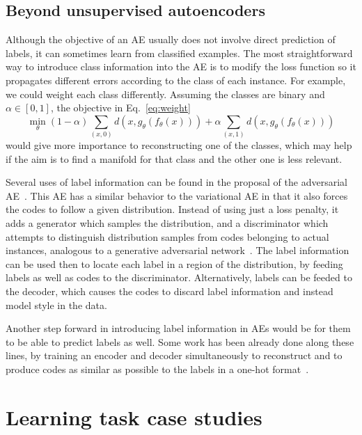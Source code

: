 \documentclass[
	fontsize=11pt, %
	twoside=false, %
	open=any, %
	secnumdepth=1, %
]{kaobook}
\begin{document}
\subsection{Beyond unsupervised autoencoders}

Although the objective of an AE usually does not involve direct prediction of labels, it can sometimes learn from classified examples. The most straightforward way to introduce class information into the AE is to modify the loss function so it propagates different errors according to the class of each instance. For example, we could weight each class differently. Assuming the classes are binary and $\alpha\in[0,1]$, the objective in Eq.~\eqref{eq:weight}
\begin{equation}\label{eq:weight}
    \min_{\theta}(1-\alpha)\sum_{(x,0)} d(x,g_{\theta}(f_{\theta}(x)))+\alpha\sum_{(x,1)} d(x,g_{\theta}(f_{\theta}(x)))
\end{equation}
would give more importance to reconstructing one of the classes, which may help if the aim is to find a manifold for that class and the other one is less relevant.

Several uses of label information can be found in the proposal of the adversarial AE~\cite{adv}. This AE has a similar behavior to the variational AE in that it also forces the codes to follow a given distribution. Instead of using just a loss penalty, it adds a generator which samples the distribution, and a discriminator which attempts to distinguish distribution samples from codes belonging to actual instances, analogous to a generative adversarial network~\cite{gan}. The label information can be used then to locate each label in a region of the distribution, by feeding labels as well as codes to the discriminator. Alternatively, labels can be feeded to the decoder, which causes the codes to discard label information and instead model style in the data.

Another step forward in introducing label information in AEs would be for them to be able to predict labels as well. Some work has been already done along these lines, by training an encoder and decoder simultaneously to reconstruct and to produce codes as similar as possible to the labels in a one-hot format~\cite{zhuang2015supervised}.

\section{Learning task case studies}\label{sec:cs}
\end{document}
